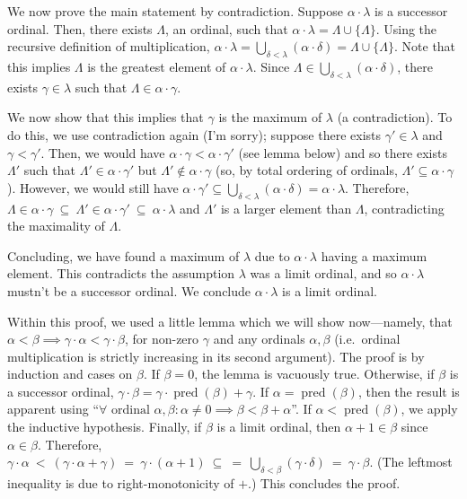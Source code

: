 \documentclass[a4paper]{article}
\begin{document}
We now prove the main statement by contradiction.
Suppose $\alpha \cdot \lambda$ is a successor ordinal.
Then, there exists $\Lambda$, an ordinal, such that
$\alpha \cdot \lambda = \Lambda \cup \{\Lambda\}$.
Using the recursive definition of multiplication,
$\alpha \cdot \lambda = \bigcup_{\delta < \lambda}(\alpha \cdot \delta) = \Lambda \cup \{\Lambda\}$.
Note that this implies $\Lambda$ is the greatest element of $\alpha \cdot \lambda$.
Since $\Lambda \in \bigcup_{\delta < \lambda}(\alpha \cdot \delta)$,
there exists $\gamma \in \lambda$
such that $\Lambda \in \alpha \cdot \gamma$.

We now show that this implies
that $\gamma$ is the maximum of $\lambda$ (a contradiction).
To do this, we use contradiction again (I'm sorry);
suppose there exists $\gamma' \in \lambda$ and $\gamma < \gamma'$.
Then, we would have $\alpha \cdot \gamma < \alpha \cdot \gamma'$ (see lemma below)
and so there exists $\Lambda'$ such that $\Lambda' \in \alpha \cdot \gamma'$ but
$\Lambda' \notin \alpha \cdot \gamma$
(so, by total ordering of ordinals, $\Lambda' \subseteq \alpha \cdot \gamma$).
However, we would still have
$\alpha \cdot \gamma' \subseteq \bigcup_{\delta < \lambda}(\alpha \cdot \delta)=\alpha \cdot \lambda$.
Therefore,
$\Lambda \in \alpha \cdot \gamma ~\subseteq~ \Lambda' \in \alpha \cdot \gamma' ~\subseteq~ \alpha \cdot \lambda$
and $\Lambda'$ is a larger element than $\Lambda$, contradicting the maximality
of $\Lambda$.

Concluding, we have found a maximum of $\lambda$
due to $\alpha \cdot \lambda$ having a maximum element.
This contradicts the assumption $\lambda$ was a limit ordinal,
and so $\alpha \cdot \lambda$ mustn't
be a successor ordinal.
We conclude $\alpha \cdot \lambda$ is a limit ordinal.

Within this proof, we used a little lemma which we will show now---namely, that $\alpha < \beta \implies \gamma \cdot \alpha < \gamma \cdot \beta$,
for non-zero $\gamma$ and any ordinals $\alpha, \beta$
(i.e.\ ordinal multiplication
is strictly increasing in its second argument).
The proof is by induction and cases on $\beta$.
If $\beta = 0$, the lemma is vacuously true.
Otherwise,
if $\beta$ is a successor ordinal,
$\gamma \cdot \beta = \gamma \cdot \operatorname{pred}(\beta) + \gamma$.
If $\alpha = \operatorname{pred}(\beta)$, then the result is apparent
using ``$\forall \text{ ordinal }\alpha,\beta : \alpha \ne 0 \implies \beta < \beta + \alpha$''.
If $\alpha < \operatorname{pred}(\beta)$,
we apply the inductive hypothesis.
Finally,
if $\beta$ is a limit ordinal, 
then
 $\alpha + 1 \in \beta$ since $\alpha \in \beta$.
Therefore, $\gamma \cdot \alpha ~<~ (\gamma \cdot \alpha + \gamma) ~=~ \gamma \cdot (\alpha + 1) ~\subseteq~ =~ \bigcup_{\delta < \beta}(\gamma \cdot \delta) ~=~\gamma \cdot \beta$.
(The leftmost inequality is due to right-monotonicity of $+$.)
This concludes the proof.
\end{document}
